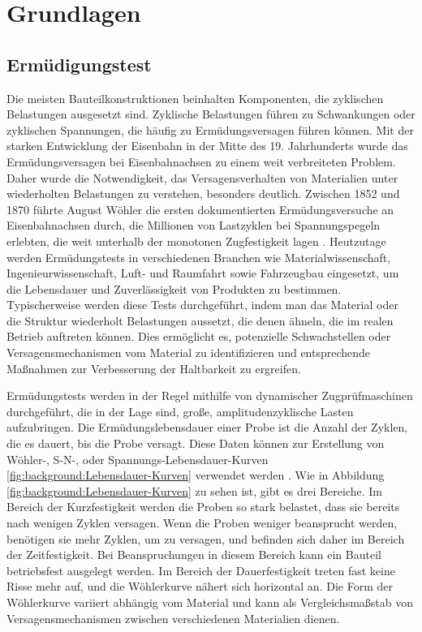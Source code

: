 \chapter{Grundlagen}
\section{Ermüdigungstest}
Die meisten Bauteilkonstruktionen beinhalten Komponenten, die zyklischen Belastungen ausgesetzt sind. Zyklische Belastungen führen zu Schwankungen oder zyklischen Spannungen, die häufig zu Ermüdungsversagen führen können. Mit der starken Entwicklung der Eisenbahn in der Mitte des 19. Jahrhunderts wurde das Ermüdungsversagen bei Eisenbahnachsen zu einem weit verbreiteten Problem. Daher wurde die Notwendigkeit, das Versagensverhalten von Materialien unter wiederholten Belastungen zu verstehen, besonders deutlich. Zwischen 1852 und 1870 führte August Wöhler die ersten dokumentierten Ermüdungsversuche an Eisenbahnachsen durch, die Millionen von Lastzyklen bei Spannungspegeln erlebten, die weit unterhalb der monotonen Zugfestigkeit lagen \cite{august_wöhler}. Heutzutage werden Ermüdungstests in verschiedenen Branchen wie Materialwissenschaft, Ingenieurwissenschaft, Luft- und Raumfahrt sowie Fahrzeugbau eingesetzt, um die Lebensdauer und Zuverlässigkeit von Produkten zu bestimmen. Typischerweise werden diese Tests durchgeführt, indem man das Material oder die Struktur wiederholt Belastungen aussetzt, die denen ähneln, die im realen Betrieb auftreten können. Dies ermöglicht es, potenzielle Schwachstellen oder Versagensmechanismen vom Material zu identifizieren und entsprechende Maßnahmen zur Verbesserung der Haltbarkeit zu ergreifen. 

Ermüdungstests werden in der Regel mithilfe von dynamischer Zugprüfmaschinen durchgeführt, die in der Lage sind, große, amplitudenzyklische Lasten aufzubringen. Die Ermüdungslebensdauer einer Probe ist die Anzahl der Zyklen, die es dauert, bis die Probe versagt. Diese Daten können zur Erstellung von Wöhler-, S-N-, oder Spannungs-Lebensdauer-Kurven \ref{fig:background:Lebensdauer-Kurven} verwendet werden \cite{fatigue_test}. Wie in Abbildung \ref{fig:background:Lebensdauer-Kurven} zu sehen ist, gibt es drei Bereiche. Im Bereich der Kurzfestigkeit werden die Proben so stark belastet, dass sie bereits nach wenigen Zyklen versagen. Wenn die Proben weniger beansprucht werden, benötigen sie mehr Zyklen, um zu versagen, und befinden sich daher im Bereich der Zeitfestigkeit. Bei Beanspruchungen in diesem Bereich kann ein Bauteil betriebsfest ausgelegt werden. Im Bereich der Dauerfestigkeit treten fast keine Risse mehr auf, und die Wöhlerkurve nähert sich horizontal an. Die Form der Wöhlerkurve variiert abhängig vom Material und kann als Vergleichsmaßstab von Versagensmechanismen zwischen verschiedenen Materialien dienen. 

